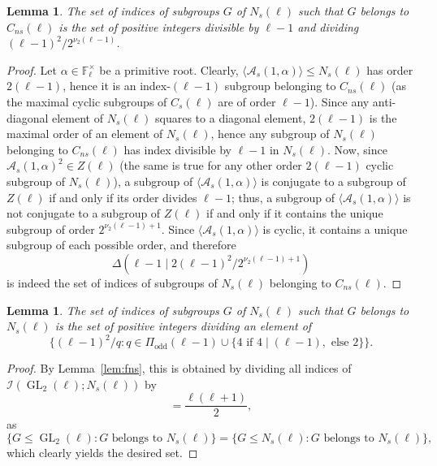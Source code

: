 \documentclass[table,dvipsnames]{amsart}
\newcommand{\F}{\mathbb{F}}
\newcommand{\GL}{\operatorname{GL}}
\newcommand{\angles}[1]{\langle #1\rangle}
\newcommand{\odd}{\mathrm{odd}}
\newtheorem{lemma}[theorem]{Lemma}
\numberwithin{equation}{section}
\newcommand{\s}{\textit{s}}
\newcommand{\ns}{\textit{ns}}
\newcommand{\Cs}{C_\s}
\newcommand{\Cns}{C_\ns}
\newcommand{\Ns}{N_\s}
\begin{document}
\begin{lemma}
\label{lem:scns}
The set of indices of subgroups $G$ of $\Ns(\ell)$ such that $G$ belongs to $\Cns(\ell)$ is the set of positive integers divisible by $\ell-1$ and dividing $(\ell-1)^2/2^{\nu_2(\ell-1)}$.
\end{lemma}
\begin{proof}
Let $\alpha\in\F_\ell^\times$ be a primitive root. Clearly, $\angles{\mathcal{A}_\s(1,\alpha)}\le\Ns(\ell)$ has order $2(\ell-1)$, hence it is an index-$(\ell-1)$ subgroup belonging to $\Cns(\ell)$ (as the maximal cyclic subgroups of $\Cs(\ell)$ are of order $\ell-1$). Since any anti-diagonal element of $\Ns(\ell)$ squares to a diagonal element, $2(\ell-1)$ is the maximal order of an element of $\Ns(\ell)$, hence any subgroup of $\Ns(\ell)$ belonging to $\Cns(\ell)$ has index divisible by $\ell-1$ in $\Ns(\ell)$. Now, since $\mathcal{A}_\s(1,\alpha)^2\in Z(\ell)$ (the same is true for any other order $2(\ell-1)$ cyclic subgroup of $\Ns(\ell)$), a subgroup of $\angles{\mathcal{A}_\s(1,\alpha)}$ is conjugate to a subgroup of $Z(\ell)$ if and only if its order divides $\ell-1$; thus, a subgroup of $\angles{\mathcal{A}_\s(1,\alpha)}$ is not conjugate to a subgroup of $Z(\ell)$ if and only if it contains the unique subgroup of order $2^{\nu_2(\ell-1)+1}$. Since $\angles{\mathcal{A}_\s(1,\alpha)}$ is cyclic, it contains a unique subgroup of each possible order, and therefore
\begin{equation*}
\Delta(\ell-1\mid 2(\ell-1)^2/2^{\nu_2(\ell-1)+1})
\end{equation*}
is indeed the set of indices of subgroups of $\Ns(\ell)$ belonging to $\Cns(\ell)$.
\end{proof}

\begin{lemma}
\label{lem:sns}
The set of indices of subgroups $G$ of $\Ns(\ell)$ such that $G$ belongs to $\Ns(\ell)$ is the set of positive integers dividing an element of
\begin{equation*}
\{(\ell-1)^2/q:q\in\Pi_\odd(\ell-1)\cup\{4\text{ if }4\mid(\ell-1),\text{ else }2\}\}.
\end{equation*}
\end{lemma}
\begin{proof}
By Lemma~\ref{lem:fns}, this is obtained by dividing all indices of $\mathcal{I}(\GL_2(\ell);\Ns(\ell))$ by
\begin{equation*}
[\GL_2(\ell):\Ns(\ell)]=\frac{\ell(\ell+1)}{2},
\end{equation*}
as
\begin{equation*}
\{G\le\GL_2(\ell):G\text{ belongs to }\Ns(\ell)\}=\{G\le\Ns(\ell):G\text{ belongs to }\Ns(\ell)\},
\end{equation*}
which clearly yields the desired set.
\end{proof}
\end{document}
